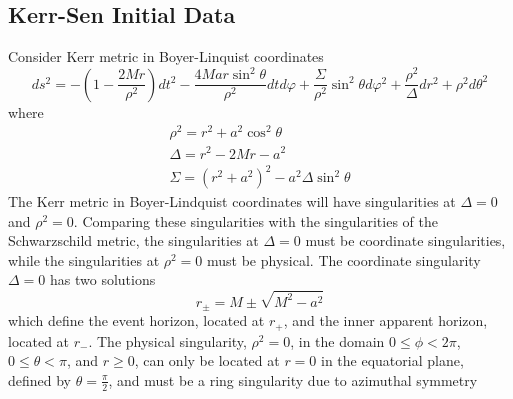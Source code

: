 \documentclass[prd]{revtex4}
\begin{document}
\subsection{Kerr-Sen Initial Data}
Consider Kerr metric in Boyer-Linquist coordinates
\begin{equation}
ds^2 = - \left(1-\frac{2 M r}{\rho^2} \right) dt^2 - \frac{4 M a r \sin^2 \theta}{\rho^2}dt d \varphi + \frac{\Sigma}{\rho^2} \sin^2 \theta d \varphi^2 + \frac{\rho^2}{\Delta} dr^2 + \rho^2 d \theta^2
\end{equation}
where
\begin{align}
\rho^2 = r^2 + a^2 \cos^2 \theta \\
\Delta = r^2 - 2 M r - a^2 \\
\Sigma = (r^2 + a^2)^2 - a^2 \Delta \sin^2 \theta
\end{align}
The Kerr metric in Boyer-Lindquist coordinates will have singularities at $\Delta = 0 $ and $\rho^2 = 0$. Comparing these singularities with the singularities of the Schwarzschild metric, the singularities at $\Delta = 0$ must be coordinate singularities, while the singularities at $ \rho^2 = 0$ must be physical. The coordinate singularity $\Delta = 0$ has two solutions
\begin{equation}
r_{\pm} = M \pm \sqrt{M^2-a^2}
\end{equation}
which define the event horizon, located at $r_{+}$, and the inner apparent horizon, located at $r_{-}$. The physical singularity, $\rho^2 = 0$, in the domain $ 0 \leq \phi < 2 \pi$, $ 0 \leq \theta < \pi$, and $r \geq 0$, can only be located at $r=0$ in the equatorial plane, defined by $\theta = \frac{\pi}{2}$, and must be a ring singularity due to azimuthal symmetry
\end{document}

